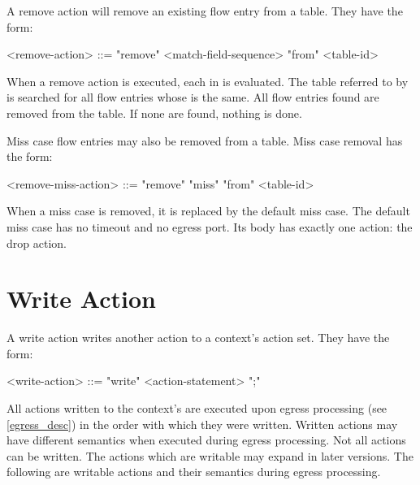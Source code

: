 A remove action will remove an existing flow entry from a table. They have the form:

\begin{minip}
\begin{grammar}
<remove-action> ::= "remove" <match-field-sequence> "from" <table-id>
\end{grammar}
\end{minip}

When a remove action is executed, each  in  is evaluated. The table referred to by  is searched for all flow entries whose  is the same. All flow entries found are removed from the table. If none are found, nothing is done.

Miss case flow entries may also be removed from a table. Miss case removal has the form: 

\begin{minip}
\begin{grammar}
<remove-miss-action> ::= "remove" "miss" "from" <table-id>
\end{grammar}
\end{minip}

When a miss case is removed, it is replaced by the default miss case. The default miss case has no timeout and no egress port. Its body has exactly one action: the drop action.

\section{Write Action} \label{guide:write}

A write action writes another action to a context's action set. They have the form:

\begin{minip}
\begin{grammar}
<write-action> ::= "write" <action-statement> ";"
\end{grammar}
\end{minip}

All actions written to the context's are executed upon egress processing (see \ref{egress_desc}) in the order with which they were written. Written actions may have different semantics when executed during egress processing. Not all actions can be written. The actions which are writable may expand in later versions. The following are writable actions and their semantics during egress processing.

